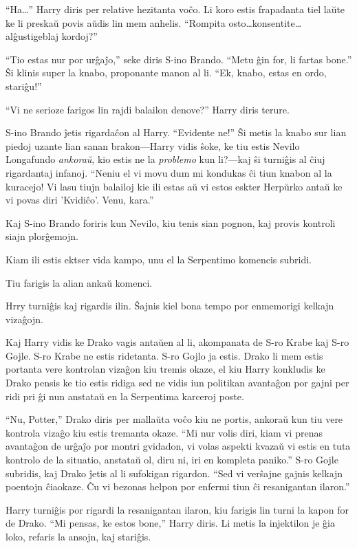 ``Ha\ldots'' Harry diris per relative hezitanta voĉo. Li koro estis
frapadanta tiel laŭte ke li preskaŭ povis aŭdis lin mem
anhelis. ``Rompita osto\ldots konsentite\ldots alĝustigeblaj kordoj?''

``Tio estas nur por urĝaĵo,'' seke diris S-ino Brando. ``Metu ĝin for,
li fartas bone.'' Ŝi klinis super la knabo, proponante manon al
li. ``Ek, knabo, estas en ordo, stariĝu!''

``Vi ne serioze farigos lin rajdi balailon denove?'' Harry diris
terure.

S-ino Brando ĵetis rigardaĉon al Harry. ``Evidente ne!'' Ŝi metis la
knabo sur lian piedoj uzante lian sanan brakon—Harry vidis ŝoke, ke
tiu estis Nevilo Longafundo \emph{ankoraŭ}, kio estis ne la
\emph{problemo} kun li?—kaj ŝi turniĝis al ĉiuj rigardantaj
infanoj. ``Neniu el vi movu dum mi kondukas ĉi tiun knabon al la
kuracejo! Vi lasu tiujn balailoj kie ili estas aŭ vi estos eskter
Herpŭrko antaŭ ke vi povas diri 'Kvidiĉo'. Venu, kara.''

Kaj S-ino Brando foriris kun Nevilo, kiu tenis sian pognon, kaj provis
kontroli siajn plorĝemojn.

Kiam ili estis ektser vida kampo, unu el la Serpentimo komencis subridi.

Tiu farigis la alian ankaŭ komenci.

Hrry turniĝis kaj rigardis ilin. Ŝajnis kiel bona tempo por enmemorigi
kelkajn vizaĝojn.

Kaj Harry vidis ke Drako vagis antaŭen al li, akompanata de S-ro Krabe
kaj S-ro Gojle. S-ro Krabe ne estis ridetanta. S-ro Gojlo ja
estis. Drako li mem estis portanta vere kontrolan vizaĝon kiu tremis
okaze, el kiu Harry konkludis ke Drako pensis ke tio estis ridiga sed
ne vidis iun politikan avantaĝon por gajni per ridi pri ĝi nun anstataŭ
en la Serpentima karceroj poste.

``Nu, Potter,'' Drako diris per mallaŭta voĉo kiu ne portis, ankoraŭ
kun tiu vere kontrola vizaĝo kiu estis tremanta okaze. ``Mi nur volis
diri, kiam vi prenas avantaĝon de urĝaĵo por montri gvidadon, vi volas
aspekti kvazaŭ vi estis en tuta kontrolo de la situatio, anstataŭ ol,
diru ni, iri en kompleta paniko.'' S-ro Gojle subridis, kaj Drako
ĵetis al li sufokigan rigardon. ``Sed vi verŝajne gajnis kelkajn
poentojn ĉiaokaze. Ĉu vi bezonas helpon por enfermi tiun ĉi
resanigantan ilaron.''

Harry turniĝis por rigardi la resanigantan ilaron, kiu farigis lin
turni la kapon for de Drako. ``Mi pensas, ke estos bone,'' Harry
diris. Li metis la injektilon je ĝia loko, refaris la ansojn, kaj
stariĝis.

